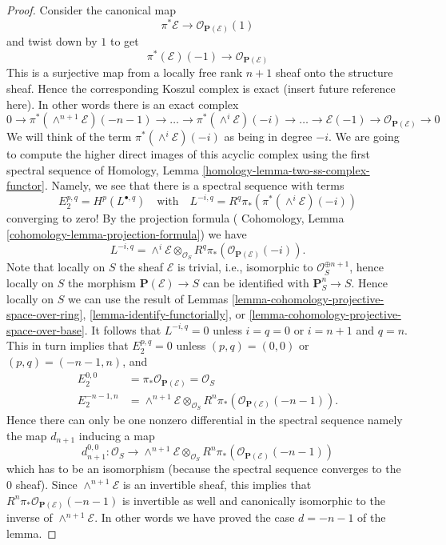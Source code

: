 \begin{proof}
Consider the canonical map
$$
\pi^*\mathcal{E} \longrightarrow \mathcal{O}_{\mathbf{P}(\mathcal{E})}(1)
$$
and twist down by $1$ to get
$$
\pi^*(\mathcal{E})(-1) \longrightarrow \mathcal{O}_{\mathbf{P}(\mathcal{E})}
$$
This is a surjective map from a locally free rank $n + 1$ sheaf onto
the structure sheaf. Hence the corresponding Koszul complex is
exact (insert future reference here). In other words there is an
exact complex
$$
0 \to
\pi^*(\wedge^{n + 1}\mathcal{E})(-n - 1) \to
\ldots \to
\pi^*(\wedge^i\mathcal{E})(-i) \to
\ldots \to
\mathcal{E}(-1) \to
\mathcal{O}_{\mathbf{P}(\mathcal{E})} \to 0
$$
We will think of the term $\pi^*(\wedge^i\mathcal{E})(-i)$ as being
in degree $-i$.
We are going to compute the higher direct images
of this acyclic complex using the first spectral sequence of
Homology, Lemma \ref{homology-lemma-two-ss-complex-functor}.
Namely, we see that there is a spectral sequence with terms
$$
E_2^{p, q} = H^p(L^{\bullet, q})
\quad
\text{with}
\quad
L^{-i, q} = R^q\pi_*\left(\pi^*(\wedge^i\mathcal{E})(-i)\right)
$$
converging to zero!
By the projection formula (
Cohomology, Lemma \ref{cohomology-lemma-projection-formula})
we have
$$
L^{-i, q} = \wedge^i\mathcal{E} \otimes_{\mathcal{O}_S}
R^q\pi_*\left(\mathcal{O}_{\mathbf{P}(\mathcal{E})}(-i)\right).
$$
Note that locally on $S$ the sheaf $\mathcal{E}$ is trivial,
i.e., isomorphic to $\mathcal{O}_S^{\oplus n + 1}$, hence locally on
$S$ the morphism $\mathbf{P}(\mathcal{E}) \to S$ can be identified
with $\mathbf{P}^n_S \to S$. Hence
locally on $S$ we can use the result of Lemmas
\ref{lemma-cohomology-projective-space-over-ring},
\ref{lemma-identify-functorially}, or
\ref{lemma-cohomology-projective-space-over-base}.
It follows that $L^{-i, q} = 0$ unless $i = q = 0$
or $i = n + 1$ and $q = n$. This in turn implies that
$E_2^{p, q} = 0$ unless $(p, q) = (0, 0)$ or
$(p, q) = (-n - 1, n)$, and
\begin{align*}
E_2^{0, 0} & = \pi_*\mathcal{O}_{\mathbf{P}(\mathcal{E})} = \mathcal{O}_S
\\
E_2^{-n - 1, n} & = \wedge^{n + 1}\mathcal{E} \otimes_{\mathcal{O}_S}
R^n\pi_*\left(\mathcal{O}_{\mathbf{P}(\mathcal{E})}(-n - 1)\right).
\end{align*}
Hence there can only be one nonzero
differential in the spectral sequence namely the map
$d_{n + 1}$ inducing a map
$$
d_{n + 1}^{0, 0} :
\mathcal{O}_S
\longrightarrow
\wedge^{n + 1}\mathcal{E} \otimes_{\mathcal{O}_S}
R^n\pi_*\left(\mathcal{O}_{\mathbf{P}(\mathcal{E})}(-n - 1)\right)
$$
which has to be an isomorphism (because the spectral sequence converges
to the $0$ sheaf). Since $\wedge^{n + 1}\mathcal{E}$ is an invertible
sheaf, this implies that
$R^n\pi_*\mathcal{O}_{\mathbf{P}(\mathcal{E})}(-n - 1)$ is invertible
as well and canonically isomorphic to the inverse of
$\wedge^{n + 1}\mathcal{E}$. In other words we have proved the case
$d = - n - 1$ of the lemma.


\end{proof}
